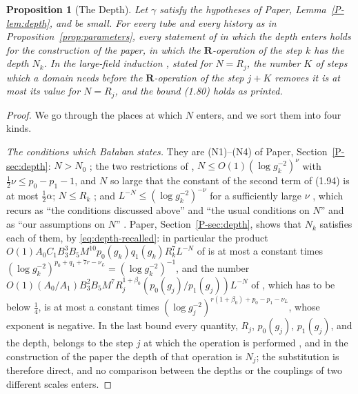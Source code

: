 \documentclass[11pt]{preprint}
\numberwithin{equation}{section}
\newtheorem{proposition}{Proposition}
\theoremstyle{definition}
\theoremstyle{remark}
\theoremstyle{plain}
\begin{document}
\begin{proposition}[The Depth]\label{prop:depth}
Let $\gamma$ satisfy the hypotheses of Paper, Lemma~\ref{P-lem:depth}, and be small. For every tube and every history as in Proposition~\ref{prop:parameters}, every statement of \cite{BalabanLFR1,BalabanLFR2} in which the depth enters holds for the construction of the paper, in which the $\mathbf R$-operation of the step $k$ has the depth $N_k$. In the large-field induction \cite[(1.80), pp.~384--387]{BalabanLFR2}, stated for $N = R_j$, the number $K$ of steps which a domain needs before the $\mathbf R$-operation of the step $j + K$ removes it is at most its value for $N = R_j$, and the bound (1.80) holds as printed.
\end{proposition}

\begin{proof}
We go through the places at which $N$ enters, and we sort them into four kinds.

\emph{The conditions which Ba{\l}aban states.} They are (N1)--(N4) of Paper, Section~\ref{P-sec:depth}: $N > N_0$ \cite[p.~179]{BalabanLFR1}; the two restrictions of \cite[(1.94), p.~198]{BalabanLFR1}, $N \leq O(1)(\log g_k^{-2})^\nu$ with $\frac12\nu \leq p_0 - p_1 - 1$, and $N$ so large that the constant of the second term of (1.94) is at most $\frac12\alpha$; $N \leq R_k$ \cite[p.~361]{BalabanLFR2}; and $L^{-N} \leq (\log g_k^{-2})^{-\nu}$ for a sufficiently large $\nu$ \cite[p.~363]{BalabanLFR2}, which recurs as ``the conditions discussed above'' and ``the usual conditions on $N$'' \cite[p.~364, (1.47), p.~368]{BalabanLFR2} and as ``our assumptions on $N$'' \cite[p.~382]{BalabanLFR2}. Paper, Section~\ref{P-sec:depth}, shows that $N_k$ satisfies each of them, by \eqref{eq:depth-recalled}: in particular the product $O(1)A_0C_1B_3^3B_5M^{10}p_0(g_k)q_1(g_k)R_k^7L^{-N}$ of \cite[(1.47)]{BalabanLFR2} is at most a constant times $(\log g_k^{-2})^{p_0+q_1+7r-\nu_L} = (\log g_k^{-2})^{-1}$, and the number $O(1)(A_0/A_1)B_3^2B_5M^7R_j^{1+\beta_0}(p_0(g_j)/p_1(g_j))L^{-N}$ of \cite[p.~382]{BalabanLFR2}, which has to be below $\frac14$, is at most a constant times $(\log g_j^{-2})^{r(1+\beta_0)+p_0-p_1-\nu_L}$, whose exponent is negative. In the last bound every quantity, $R_j$, $p_0(g_j)$, $p_1(g_j)$, and the depth, belongs to the step $j$ at which the operation is performed \cite[p.~382]{BalabanLFR2}, and in the construction of the paper the depth of that operation is $N_j$; the substitution is therefore direct, and no comparison between the depths or the couplings of two different scales enters.


\end{proof}
\end{document}
